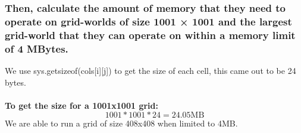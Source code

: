 \documentclass{article}
\begin{document}
\subsubsection*{Then,
calculate the amount of memory that they need to operate on grid-worlds of size 1001 × 1001 and the largest grid-world that
they can operate on within a memory limit of 4 MBytes.}
We use sys.getsizeof(cols[i][j]) to get the size of each cell, this came out to be 24 bytes.\\\\
\textbf{To get the size for a 1001x1001 grid: }
\[
	1001 * 1001 * 24 = 24.05 \text{MB}
\]
We are able to run a grid of size 408x408 when limited to 4MB.


\end{document}
